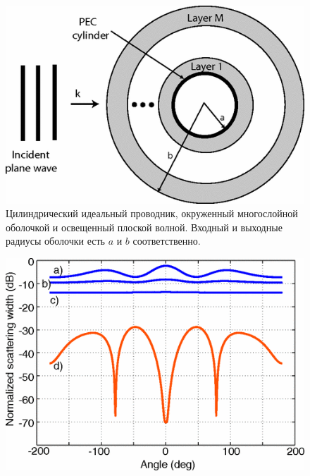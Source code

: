 \documentclass[a4paper, 12pt]{article}
\begin{document}
\clearpage 

\begin{figure}[t]
  \centering
  \includegraphics[height=0.25\paperheight, width=0.55\paperwidth]{fig1.png}
  \caption{Цилиндрический идеальный проводник, окруженный многослойной оболочкой
  и освещенный плоской волной. Входный и выходные радиусы оболочки есть 
  $a$ и $b$ соответственно.}
  \label{fig:1}
\end{figure}

\begin{figure}[t]
  \centering
  \includegraphics[height=0.25\paperheight, width=0.55\paperwidth]{fig2.png}
  \caption{}
  \label{fig:2}
\end{figure}
\end{document}
